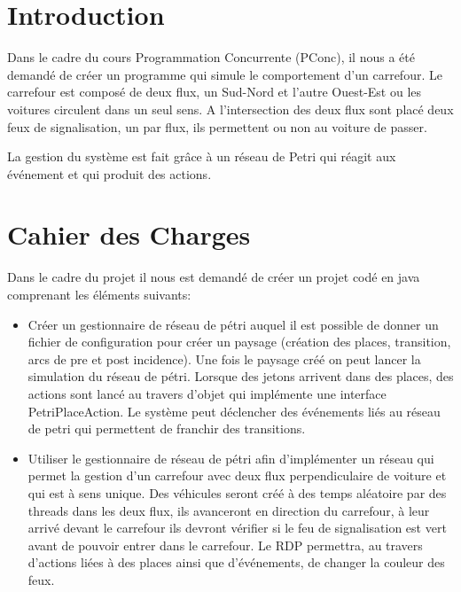 \documentclass[11pt,a4paper, openany]{memoir}
\begin{document}





\chapter{Introduction}

Dans le cadre du cours Programmation Concurrente (PConc), il nous a été demandé de créer un programme qui simule le comportement d'un carrefour. Le carrefour est composé de deux flux, un Sud-Nord et l'autre Ouest-Est ou les voitures circulent dans un seul sens. A l'intersection des deux flux sont placé deux feux de signalisation, un par flux, ils permettent ou non au voiture de passer.\par
La gestion du système est fait grâce à un réseau de Petri qui réagit aux événement et qui produit des actions.

\chapter{Cahier des Charges}

Dans le cadre du projet il nous est demandé de créer un projet codé en java comprenant les éléments suivants:
\begin{itemize}
\item Créer un gestionnaire de réseau de pétri auquel il est possible de donner un fichier de configuration pour créer un paysage (création des places, transition, arcs de pre et post incidence). Une fois le paysage créé on peut lancer la simulation du réseau de pétri. Lorsque des jetons arrivent dans des places, des actions sont lancé au travers d'objet qui implémente une interface PetriPlaceAction. Le système peut déclencher des événements liés au réseau de petri qui permettent de franchir des transitions.
\item Utiliser le gestionnaire de réseau de pétri afin d'implémenter un réseau qui permet la gestion d'un carrefour avec deux flux perpendiculaire de voiture et qui est à sens unique. Des véhicules seront créé à des temps aléatoire par des threads dans les deux flux, ils avanceront en direction du carrefour, à leur arrivé devant le carrefour ils devront vérifier si le feu de signalisation est vert avant de pouvoir entrer dans le carrefour. Le RDP permettra, au travers d'actions liées à des places ainsi que d'événements, de changer la couleur des feux.
\end{itemize}
\end{document}
